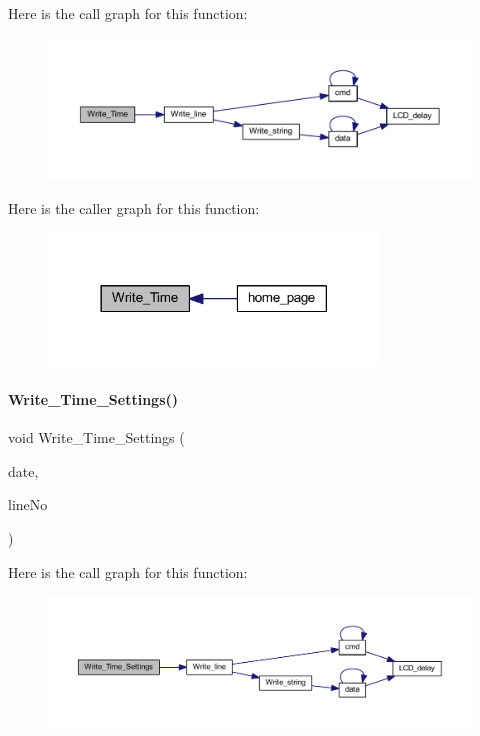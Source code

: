 Here is the call graph for this function\+:
\nopagebreak
\begin{figure}[H]
\begin{center}
\leavevmode
\includegraphics[width=350pt]{a00035_a56e791a9efe9fd411e81433c290b733e_cgraph}
\end{center}
\end{figure}
Here is the caller graph for this function\+:
\nopagebreak
\begin{figure}[H]
\begin{center}
\leavevmode
\includegraphics[width=249pt]{a00035_a56e791a9efe9fd411e81433c290b733e_icgraph}
\end{center}
\end{figure}
\mbox{\label{a00035_aaa71cdb88431591180cebebb47616028}} 
\paragraph{Write\+\_\+\+Time\+\_\+\+Settings()}
{\footnotesize\ttfamily void Write\+\_\+\+Time\+\_\+\+Settings (\begin{DoxyParamCaption}\item[{\textbf{ Date\+Time}}]{date,  }\item[{int}]{line\+No }\end{DoxyParamCaption})}

Here is the call graph for this function\+:
\nopagebreak
\begin{figure}[H]
\begin{center}
\leavevmode
\includegraphics[width=350pt]{a00035_aaa71cdb88431591180cebebb47616028_cgraph}
\end{center}
\end{figure}


